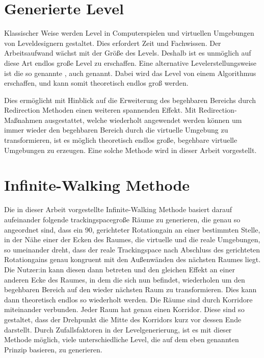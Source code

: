 \section{Generierte Level} %

Klassischer Weise werden Level in Computerspielen und virtuellen Umgebungen von Leveldesignern gestaltet. Dies erfordert Zeit und Fachwissen.
Der Arbeitsaufwand wächst mit der Größe des Levels. Deshalb ist es unmöglich auf diese Art endlos große Level zu erschaffen. Eine alternative Levelerstellungsweise ist die so genannte , auch  genannt. Dabei wird das Level von einem Algorithmus erschaffen, und kann somit theoretisch endlos groß werden.

Dies ermöglicht mit Hinblick auf die Erweiterung des begehbaren Bereichs durch Redirection Methoden einen weiteren spannenden Effekt. %
Mit Redirection-Maßnahmen ausgestattet, welche wiederholt angewendet werden können um immer wieder den begehbaren Bereich durch die virtuelle Umgebung zu transformieren, ist es möglich theoretisch endlos große, begehbare virtuelle Umgebungen zu erzeugen. Eine solche  Methode wird in dieser Arbeit vorgestellt.

\section{Infinite-Walking Methode}
Die in dieser Arbeit vorgestellte Infinite-Walking Methode basiert darauf aufeinander folgende trackingspacegroße Räume zu generieren, die genau so angeordnet sind, dass ein
90\textdegree, gerichteter
Rotationgain an einer bestimmten Stelle, in der Nähe einer der Ecken des Raumes, die virtuelle und die reale Umgebungen, so umeinander dreht, dass der reale Trackingspace nach Abschluss des gerichteten Rotationgains genau kongruent mit den Außenwänden des nächsten Raumes liegt. Die Nutzer:in kann diesen dann betreten und den gleichen Effekt an einer anderen Ecke des Raumes, in dem die sich nun befindet, wiederholen um den begehbaren Bereich auf den wieder nächsten Raum zu transformieren. Dies kann dann theoretisch endlos so wiederholt werden. Die Räume sind durch Korridore miteinander verbunden. Jeder Raum hat genau einen Korridor. Diese sind so gestaltet, dass der Drehpunkt die Mitte des Korridors kurz vor dessen Ende darstellt. Durch Zufallsfaktoren in der Levelgenerierung, ist es mit dieser Methode möglich, viele unterschiedliche Level, die auf dem eben genannten Prinzip basieren, zu generieren. %

